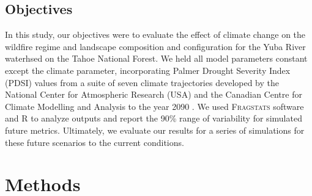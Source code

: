 \subsection{Objectives}
In this study, our objectives were to evaluate the effect of climate change on the wildfire regime and landscape composition and configuration for the Yuba River waterhsed on the Tahoe National Forest. We held all model parameters constant except the climate parameter, incorporating Palmer Drought Severity Index (PDSI) values from a suite of seven climate trajectories developed by the National Center for Atmospheric Research (USA) and the Canadian Centre for Climate Modelling and Analysis to the year 2090 \citep{Cook2014}. We used \textsc{Fragstats} software and R to analyze outputs and report the 90\% range of variability for simulated future metrics. Ultimately, we evaluate our results for a series of simulations for these future scenarios to the current conditions. 


















\section{Methods}

